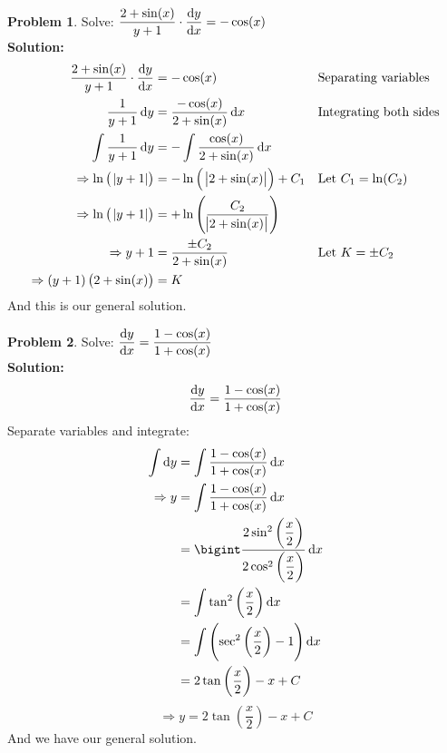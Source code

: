 \documentclass[14]{article}
\theoremstyle{definition}
\newtheorem{prob}{Problem}
\theoremstyle{case}
\begin{document}
\pagebreak
\begin{prob}
Solve: $\dfrac{2+\sin(x)}{y + 1} \cdot \dfrac{\dif y}{\dif x} = -\cos(x)$\\
\textbf{Solution:}\\
\begin{align*}
\dfrac{2+\sin(x)}{y + 1} \cdot \dfrac{\dif y}{\dif x} &= -\cos(x) && \text{Separating variables}\\
\dfrac1{y + 1} \dif y &= \dfrac{-\cos(x)}{2 + \sin(x)} \dif x && \text{Integrating both sides}\\
\int\dfrac1{y + 1} \dif y &= -\int\dfrac{\cos(x)}{2 + \sin(x)} \dif x\\
\Rightarrow \ln\left(\;\abs{y+1}\right) &= - \ln\left(\;\abs{2+\sin(x)}\right) + C_1 && \text{Let } C_1 = \ln(C_2)\\
\Rightarrow \ln\left(\;\abs{y+1} \right) &= + \ln\left(\dfrac{C_2}{\abs{2+\sin(x)}}\right)\\
\Rightarrow y + 1 &= \dfrac{\pm C_2}{2 + \sin(x)} && \text{Let } K = \pm C_2\\
\Rightarrow \left(y + 1\right)\left(2+\sin(x)\right) &= K
\end{align*}
And this is our general solution.
\end{prob}
\begin{prob}
Solve: $\dfrac{\dif y}{\dif x} = \dfrac{1-\cos(x)}{1+\cos(x)}$ \\
\textbf{Solution:}
\[\dfrac{\dif y}{\dif x} = \dfrac{1-\cos(x)}{1+\cos(x)}\]
Separate variables and integrate:
\begin{align*}
\int\dif y &= \int \dfrac{1-\cos(x)}{1+\cos(x)} \dif x\\
\Rightarrow y &= \int \dfrac{1-\cos(x)}{1+\cos(x)}\dif x\\
&= \bigint \dfrac{2 \sin^2 \left( \dfrac{x}2 \right)}{2 \cos^2 \left( \dfrac{x}2 \right)} \dif x\\
&= \int \tan^2\left( \dfrac{x}2 \right) \dif x\\
&= \int \left( \sec^2\left(\dfrac{x}2\right) - 1 \right) \dif x\\
&= 2\tan\left(\dfrac{x}2\right) - x + C
\end{align*}
\[\Rightarrow y = 2\tan\left(\dfrac{x}2\right) - x + C \]
And we have our general solution.
\end{prob}
\pagebreak
\end{document}
